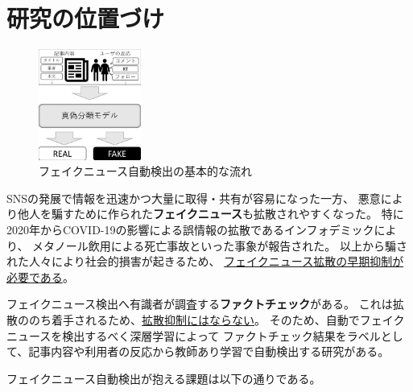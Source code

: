 
\section{研究の位置づけ}


\setlength\intextsep{0pt}
\setlength\textfloatsep{0pt}
\begin{figure}
    \centering
    \includegraphics[width=0.3\textwidth]{figs/base_model.pdf}
    \vspace{-1cm} 
    \caption{フェイクニュース自動検出の基本的な流れ}
    \label{fig:objects}
\end{figure}
SNSの発展で情報を迅速かつ大量に取得・共有が容易になった一方、
悪意により他人を騙すために作られた\textbf{フェイクニュース}も拡散されやすくなった。
特に2020年からCOVID-19の影響による誤情報の拡散であるインフォデミックにより、
メタノール飲用による死亡事故\cite{iraninfo}といった事象が報告された。
以上から騙された人々により社会的損害が起きるため、
\underline{フェイクニュース拡散の早期抑制が必要である}\cite{snsinfo}。

フェイクニュース検出へ有識者が調査する\textbf{ファクトチェック}がある。
これは拡散ののち着手されるため、\underline{拡散抑制にはならない}。
そのため、自動でフェイクニュースを検出するべく深層学習によって
ファクトチェック結果をラベルとして、記事内容や利用者の反応から教師あり学習で自動検出する研究がある\cite{Wang:2018:EEA:3219819.3219903}。

フェイクニュース自動検出が抱える課題は以下の通りである。

